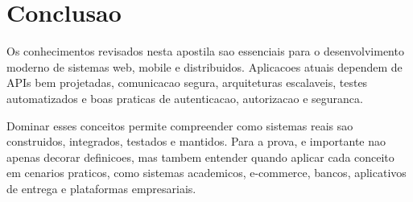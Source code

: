 \documentclass[12pt,a4paper]{article}
\begin{document}
\section{Conclusao}

Os conhecimentos revisados nesta apostila sao essenciais para o desenvolvimento moderno de sistemas web, mobile e distribuidos. Aplicacoes atuais dependem de APIs bem projetadas, comunicacao segura, arquiteturas escalaveis, testes automatizados e boas praticas de autenticacao, autorizacao e seguranca.

Dominar esses conceitos permite compreender como sistemas reais sao construidos, integrados, testados e mantidos. Para a prova, e importante nao apenas decorar definicoes, mas tambem entender quando aplicar cada conceito em cenarios praticos, como sistemas academicos, e-commerce, bancos, aplicativos de entrega e plataformas empresariais.
\end{document}
